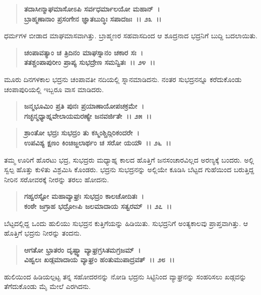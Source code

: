 \begin{verse}
\textbf{ತದಾಸೀನ್ಮಾಘಮಾಸೋಽಪಿ ಸರ್ವಧರ್ಮಾಲಯೋ ಮಹಾನ್~।}\\\textbf{ಬ್ರಾಹ್ಮಣಾನಾಂ ಪ್ರಸಂಗೇನ ಜ್ಞಾತಬುದ್ಧಿಃ ಸಪಾದಜಃ~।। ೨೩~।।}
\end{verse}

ಧರ್ಮಗಳ ಬೀಡಾದ ಮಾಘಮಾಸವಾಗಿತ್ತು. ಬ್ರಾಹ್ಮಣರ ಸಹವಾಸದಿಂದ ಆ ಶೂದ್ರನಾದ ಭದ್ರನಿಗೆ ಬುದ್ದಿ ಬದಲಾಯಿತು.

\begin{verse}
\textbf{ಚಂಪಾವತ್ಯಾಂ ಚ ತ್ರಿದಿನಂ ಮಾಘಸ್ನಾನಂ ಚಕಾರ ಸಃ~।}\\\textbf{ತತಶ್ಚಂಪಾಪುರೀಂ ಪ್ರಾಪ್ಯ ಸುಭದ್ರೇಣ ಸಮನ್ವಿತಃ~।। ೨೪~।।}
\end{verse}

ಮೂರು ದಿನಗಳಕಾಲ ಭದ್ರನು ಚಂಪಾವತೀ ನದಿಯಲ್ಲಿ ಸ್ನಾನಮಾಡಿದನು. ನಂತರ ಸುಭದ್ರನನ್ನೂ ಕರೆದುಕೊಂಡು ಚಂಪಾಪುರಿಯಲ್ಲಿ ಇಬ್ಬರೂ ವಾಸ ಮಾಡಿದರು.

\begin{verse}
\textbf{ಜನ್ಮಭೂಮಿಂ ಪ್ರತಿ ಪುನಃ ಪ್ರಯಾಣಾಯೋಪಚಕ್ರಮೇ~।}\\\textbf{ಗಚ್ಛನ್ಮಧ್ಯಾಹ್ನವೇಲಾಯಮರಣ್ಯೇ ಜನವರ್ಜಿತೇ~।। ೨೫~।। }
\end{verse}

\begin{verse}
\textbf{ಶ್ರಾಂತೋ ಭದ್ರಃ ಸುಭದ್ರಂ ತು ಕಸ್ಮಿಂಶ್ಚಿದ್ಗಿರಿಕಂದರೇ~।}\\\textbf{ಉಪವಿಶ್ಯ ಕ್ಷಣಂ ಕಿಂಚಿಜ್ಜಲಾರ್ಥಂ ಚ ಸರೋ ಯಯೌ~।। ೨೬~।।}
\end{verse}

ತಮ್ಮ ಊರಿಗೆ ಹೊರಟು ಭದ್ರ, ಸುಭದ್ರರು ಮಧ್ಯಾಹ್ನ ಕಾಲದ ಹೊತ್ತಿಗೆ ಜನಸಂಚಾರವಿಲ್ಲದ ಅರಣ್ಯಕ್ಕೆ ಬಂದರು. ಅಲ್ಲಿ ಸ್ವಲ್ಪ ಹೊತ್ತು ಕುಳಿತು ವಿಶ್ರಮಿಸಿ ಕೊಂಡರು. ಭದ್ರನು ಸುಭದ್ರನನ್ನು ಅಲ್ಲಿಯೇ ಕೂಡಿಸಿ ಬೆಟ್ಟದ ಗುಹೆಯಿಂದ ಬರುತ್ತಿದ್ದ ನೀರಿನ ಸರೋವರಕ್ಕೆ ನೀರನ್ನು ತರಲು ಹೋದನು.

\begin{verse}
\textbf{ಗಹ್ವರಸ್ಟೋ ಮಹಾವ್ಯಾಘ್ರಃ ಸುಭದ್ರಂ ಕಾಲಚೋದಿತಃ~।}\\\textbf{ಕಂಠೇ ಜಗ್ರಾಹ ಭದ್ರೋsಪಿ ಜಲಮಾದಾಯ ಸತ್ವರಮ್~।। ೨೭~।।}
\end{verse}

ಬೆಟ್ಟದಲ್ಲಿದ್ದ ಒಂದು ಹುಲಿಯು ಸುಭದ್ರನ ಕುತ್ತಿಗೆಯನ್ನು ಹಿಡಿಯಿತು. ಸುಭದ್ರನಿಗೆ ಅಂತ್ಯಕಾಲವು ಪ್ರಾಪ್ತವಾಗಿತ್ತು. ಆ ಹೊತ್ತಿಗೆ ಭದ್ರನು ನೀರನ್ನು ತಂದನು.

\begin{verse}
\textbf{ಆಗತೋ ಭ್ರಾತರಂ ದೃಷ್ಟ್ವಾ ವ್ಯಾಘ್ರಗ್ರಸಿತಮಗ್ರಜಮ್~।}\\\textbf{ವಿಹ್ವಲಃ ಖಡ್ಗಮಾದಾಯ ವ್ಯಾಘ್ರಂ ಹಂತುಮುಪಾದ್ರವತ್~।। ೨೮~।।}
\end{verse}

ಹುಲಿಯಿಂದ ಹಿಡಿಯಲ್ಪಟ್ಟ ತನ್ನ ಸಹೋದರನನ್ನು ನೋಡಿ ಭದ್ರನು ಸಿಟ್ಟಿನಿಂದ ವ್ಯಾಘ್ರನನ್ನು ಸಂಹರಿಸಲು ಖಡ್ಗವನ್ನು ತೆಗೆದುಕೊಂಡು ಮೈ ಮೇಲೆ ಎರಗಿದನು.

